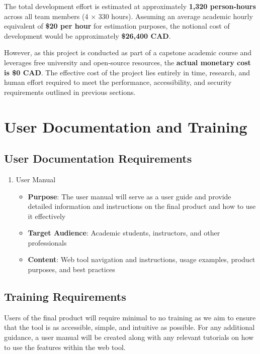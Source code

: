 \documentclass[12pt]{article}
\begin{document}
The total development effort is estimated at approximately
\textbf{1,320 person-hours} across all team members (4 × 330 hours).
Assuming an average academic hourly equivalent of \textbf{\$20 per
hour} for estimation purposes, the notional cost of development would
be approximately \textbf{\$26,400 CAD}.

However, as this project is conducted as part of a capstone academic
course and leverages free university and open-source resources, the
\textbf{actual monetary cost is \$0 CAD}.
The effective cost of the project lies entirely in time, research,
and human effort required to meet the performance, accessibility, and
security requirements outlined in previous sections.

\section{User Documentation and Training}
\subsection{User Documentation Requirements}
\begin{enumerate}
  \item User Manual
    \begin{itemize}
      \item \textbf{Purpose}: The user manual will serve as a user
        guide and provide detailed information and instructions on
        the final product and how to use it effectively
      \item \textbf{Target Audience}: Academic students, instructors,
        and other professionals
      \item \textbf{Content}: Web tool navigation and instructions,
        usage examples, product purposes, and best practices
    \end{itemize}
\end{enumerate}
\subsection{Training Requirements}
Users of the final product will require minimal to no training as we
aim to ensure that the tool is as accessible, simple, and intuitive
as possible. For any additional guidance,
a user manual will be created along with any relevant tutorials on
how to use the features within the web tool.
\end{document}
